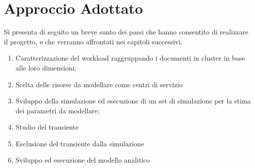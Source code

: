 \section{Approccio Adottato}
Si presenta di seguito un breve sunto dei passi che hanno consentito di realizzare il progetto, e che verranno affrontati nei capitoli successivi.
\begin{enumerate}
	\item Caratterizzazione del workload raggruppando i documenti in cluster in base alle loro dimensioni;
	\item Scelta delle risorse da modellare come centri di servizio
	\item Sviluppo della simulazione ed esecuzione di un set di simulazione per la stima dei parametri da modellare;
	\item Studio del transiente
	\item Esclusione del transiente dalla simulazione 
	\item Sviluppo ed esecuzione del modello analitico
\end{enumerate}

